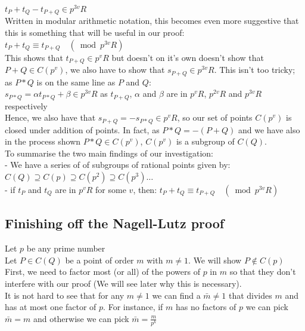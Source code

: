 \documentclass{article}
\begin{document}
$t_P + t_Q - t_{P+Q} \in p^{3v}R$ \\

Written in modular arithmetic notation, this becomes even more suggestive that this is something that will be useful in our proof: \\

$t_P + t_Q  \equiv t_{P+Q} \quad (\bmod{p^{3v}R})$ \\

This shows that $t_{P+Q} \in p^{v}R$ but doesn't on it's own doesn't show that $P + Q \in C(p^v)$, we also have to show that $s_{P + Q} \in p^{3v}R$. This isn't too tricky; as $P*Q$ is on the same line as $P$ and $Q$:\\

$s_{P*Q} = \alpha t_{P*Q} + \beta \in p^{3v}R$ \quad as $t_{P+Q}$, $\alpha$ and $\beta$ are in $p^v R$, $p^{2v} R$ and $p^{3v} R$ respectively\\

Hence, we also have that $s_{P+Q} = -s_{P*Q} \in p^v R$, so our set of points $C(p^v)$ is closed under addition of points. In fact, as $P*Q = - (P+Q)$ and we have also in the process shown $P*Q \in C(p^v)$, $C(p^v)$ is a subgroup of $C(Q)$. \\

To summarise the two main findings of our investigation:\\

- We have a series of of subgroups of rational points given by: $C(Q) \supseteq C(p) \supseteq C(p^2) \supseteq C(p^3) \dots$\\

- if $t_P$ and $t_Q$ are in $p^v R$ for some $v$, then: $t_P + t_Q  \equiv t_{P+Q} \quad (\bmod{p^{3v}R})$

\subsection{Finishing off the Nagell-Lutz proof}

Let $p$ be any prime number\\

Let $P \in C(Q)$ be a point of order $m$ with $m \neq 1$. We will show $P \notin C(p)$ \\

First, we need to factor most (or all) of the powers of $p$ in $m$ so that they don't interfere with our proof (We will see later why this is necessary).\\

It is not hard to see that for any $m \neq 1$ we can find a $\bar{m} \neq 1$ that divides $m$ and has at most one factor of $p$. For instance, if $m$ has no factors of $p$ we can pick $\bar{m} = m$ and otherwise we can pick $\bar{m} = \frac{m}{p^k}$
\end{document}
